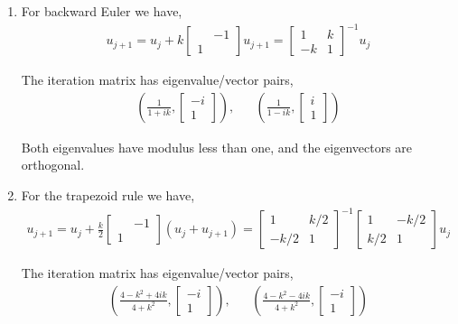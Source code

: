 \documentclass[10pt]{article}
\begin{document}
\begin{solution}[Solution]
\begin{enumerate}[label=(\alph*)]
    \item For backward Euler we have,
        \begin{align*}
            u_{j+1} = u_j + k \left[\begin{array}{cc}& -1 \\ 1\end{array}\right] u_{j+1}
                = \left[\begin{array}{rr}1 & k \\ -k & 1\end{array}\right]^{-1} u_j
        \end{align*}

        The iteration matrix has eigenvalue/vector pairs,
        \begin{align*}
            \left( \frac{1}{1+ik}, \left[\begin{array}{r} -i \\ 1\end{array}\right] \right), &&
            \left( \frac{1}{1-ik}, \left[\begin{array}{r} i \\ 1\end{array}\right] \right)
        \end{align*}
        
        Both eigenvalues have modulus less than one, and the eigenvectors are orthogonal.

    \item
        For the trapezoid rule we have,
        \begin{align*}
            u_{j+1} = u_j + \frac{k}{2} \left[\begin{array}{cc}&-1\\1\end{array}\right](u_j+u_{j+1})
                = \left[\begin{array}{rr}1 & k/2 \\ -k/2 & 1\end{array}\right]^{-1} \left[\begin{array}{rr}1 & -k/2 \\ k/2 & 1\end{array}\right] u_j
        \end{align*}
        
        The iteration matrix has eigenvalue/vector pairs,
        \begin{align*}
            \left( \frac{4-k^2+4ik}{4+k^2}, \left[\begin{array}{r} -i \\ 1\end{array}\right] \right), &&
            \left( \frac{4-k^2-4ik}{4+k^2}, \left[\begin{array}{r} -i \\ 1\end{array}\right] \right)
        \end{align*}


\end{enumerate}
\end{solution}
\end{document}
